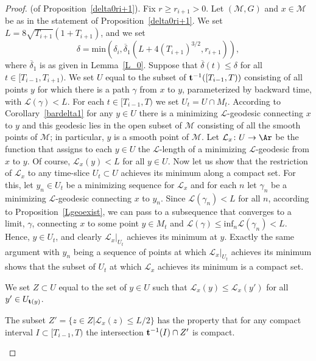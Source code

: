 \begin{proof}(of Proposition~\ref{delta0ri+1}).
Fix $r\ge r_{i+1}>0$. Let $({\mathcal M},G)$ and $x\in {\mathcal M}$ be
as in the statement of Proposition~\ref{delta0ri+1}. We set
$L=8\sqrt{T_{i+1}}(1+T_{i+1})$, and we set
$$\delta=\mathrm{min}\left(\delta_i,\overline \delta_1(L+4(T_{i+1})^{3/2},r_{i+1})\right),$$
where $\overline\delta_1$ is  as given in Lemma~\ref{L_0}.
Suppose that $\overline\delta(t)\le
\delta$ for all $t\in [T_{i-1},T_{i+1})$. We set $U$ equal to the
subset of ${\bf t}^{-1}([T_{i-1},T))$ consisting of all points $y$
for which there is a path $\gamma$ from $x$ to $y$, parameterized by
backward time, with ${\mathcal L}(\gamma)<L$. For each $t\in
[T_{i-1},T)$ we set $U_t=U\cap M_t$. According to
Corollary~\ref{bardelta1} for any $y\in U$ there is a minimizing
${\mathcal L}$-geodesic connecting $x$ to $y$ and this geodesic lies
in the open subset of ${\mathcal M}$ consisting of all the smooth
points of ${\mathcal M}$; in particular, $y$ is a smooth
point of ${\mathcal M}$. Let ${\mathcal L}_x\colon U\to \Ar$ be the
function that assigns to each $y\in U$ the ${\mathcal L}$-length of
a minimizing ${\mathcal L}$-geodesic from $x$ to $y$. Of course,
${\mathcal L}_x(y)<L$ for all  $y\in U$. Now let us show that the
restriction of ${\mathcal L}_x$ to any time-slice $U_t\subset U$
achieves its minimum along a compact set. For this, let $y_n\in U_t$
be a minimizing sequence for ${\mathcal L}_x$ and for each $n$ let
$\gamma_n$ be a minimizing ${\mathcal L}$-geodesic connecting $x$ to
$y_n$. Since ${\mathcal L}(\gamma_n)<L$ for all $n$, according to
Proposition~\ref{Lgeoexist}, we can pass to a subsequence that
converges to a limit, $\gamma$, connecting $x$ to some point $y\in
M_t$ and ${\mathcal L}(\gamma)\le \mathrm{inf}_{n}{\mathcal L}(\gamma_n)<L$. Hence, $y\in
U_t$, and clearly ${\mathcal L}_x|_{U_t}$ achieves its minimum at
$y$. Exactly the same argument with $y_n$ being a sequence of points
at which ${\mathcal L}_x|_{U_t}$ achieves its minimum shows  that
the subset of $U_t$ at which ${\mathcal L}_x$ achieves its minimum
is a compact set.


We set $Z\subset U$ equal to the set of $y\in U$ such that
${\mathcal L}_x(y)\le {\mathcal L}_x(y')$ for all $y'\in  U_{{\bf
t}(y)}$.

\begin{claim}
\label{claim:Z-prime-compact}
The subset  $Z'=\{z\in Z|{\mathcal L}_x(z)\le L/2\}$ has the property
that for any compact interval $I\subset [T_{i-1},T)$ the
intersection ${\bf t}^{-1}(I)\cap Z'$ is compact.
\end{claim}


\end{proof}
